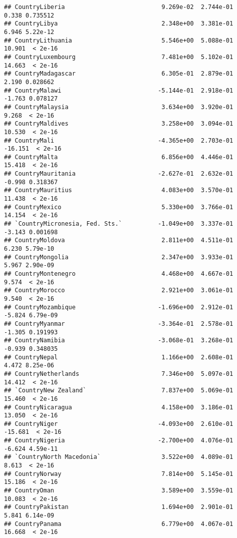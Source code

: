 \documentclass[
]{article}
\begin{document}
\begin{verbatim}
## CountryLiberia                           9.269e-02  2.744e-01   0.338 0.735512
## CountryLibya                             2.348e+00  3.381e-01   6.946 5.22e-12
## CountryLithuania                         5.546e+00  5.088e-01  10.901  < 2e-16
## CountryLuxembourg                        7.481e+00  5.102e-01  14.663  < 2e-16
## CountryMadagascar                        6.305e-01  2.879e-01   2.190 0.028662
## CountryMalawi                           -5.144e-01  2.918e-01  -1.763 0.078127
## CountryMalaysia                          3.634e+00  3.920e-01   9.268  < 2e-16
## CountryMaldives                          3.258e+00  3.094e-01  10.530  < 2e-16
## CountryMali                             -4.365e+00  2.703e-01 -16.151  < 2e-16
## CountryMalta                             6.856e+00  4.446e-01  15.418  < 2e-16
## CountryMauritania                       -2.627e-01  2.632e-01  -0.998 0.318367
## CountryMauritius                         4.083e+00  3.570e-01  11.438  < 2e-16
## CountryMexico                            5.330e+00  3.766e-01  14.154  < 2e-16
## `CountryMicronesia, Fed. Sts.`          -1.049e+00  3.337e-01  -3.143 0.001698
## CountryMoldova                           2.811e+00  4.511e-01   6.230 5.79e-10
## CountryMongolia                          2.347e+00  3.933e-01   5.967 2.90e-09
## CountryMontenegro                        4.468e+00  4.667e-01   9.574  < 2e-16
## CountryMorocco                           2.921e+00  3.061e-01   9.540  < 2e-16
## CountryMozambique                       -1.696e+00  2.912e-01  -5.824 6.79e-09
## CountryMyanmar                          -3.364e-01  2.578e-01  -1.305 0.191993
## CountryNamibia                          -3.068e-01  3.268e-01  -0.939 0.348035
## CountryNepal                             1.166e+00  2.608e-01   4.472 8.25e-06
## CountryNetherlands                       7.346e+00  5.097e-01  14.412  < 2e-16
## `CountryNew Zealand`                     7.837e+00  5.069e-01  15.460  < 2e-16
## CountryNicaragua                         4.158e+00  3.186e-01  13.050  < 2e-16
## CountryNiger                            -4.093e+00  2.610e-01 -15.681  < 2e-16
## CountryNigeria                          -2.700e+00  4.076e-01  -6.624 4.59e-11
## `CountryNorth Macedonia`                 3.522e+00  4.089e-01   8.613  < 2e-16
## CountryNorway                            7.814e+00  5.145e-01  15.186  < 2e-16
## CountryOman                              3.589e+00  3.559e-01  10.083  < 2e-16
## CountryPakistan                          1.694e+00  2.901e-01   5.841 6.14e-09
## CountryPanama                            6.779e+00  4.067e-01  16.668  < 2e-16

\end{verbatim}
\end{document}
